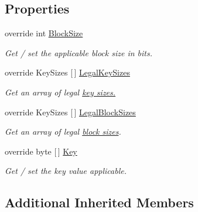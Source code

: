 \subsection*{Properties}
\begin{DoxyCompactItemize}
\item 
override int \hyperlink{class_i_c_sharp_code_1_1_sharp_zip_lib_1_1_encryption_1_1_pkzip_classic_managed_a66da85bc3587627858ae157947168745}{Block\+Size}
\begin{DoxyCompactList}\small\item\em Get / set the applicable block size in bits. \end{DoxyCompactList}\item 
override Key\+Sizes \mbox{[}$\,$\mbox{]} \hyperlink{class_i_c_sharp_code_1_1_sharp_zip_lib_1_1_encryption_1_1_pkzip_classic_managed_a14733d24deb8b0124d4f4620dfffb33e}{Legal\+Key\+Sizes}
\begin{DoxyCompactList}\small\item\em Get an array of legal \hyperlink{}{key sizes.} \end{DoxyCompactList}\item 
override Key\+Sizes \mbox{[}$\,$\mbox{]} \hyperlink{class_i_c_sharp_code_1_1_sharp_zip_lib_1_1_encryption_1_1_pkzip_classic_managed_ad7671cedabb0912b285c15385fe9cf8d}{Legal\+Block\+Sizes}
\begin{DoxyCompactList}\small\item\em Get an array of legal \hyperlink{}{block sizes}. \end{DoxyCompactList}\item 
override byte \mbox{[}$\,$\mbox{]} \hyperlink{class_i_c_sharp_code_1_1_sharp_zip_lib_1_1_encryption_1_1_pkzip_classic_managed_a5198a7212968d48a8edb4bd8a273593b}{Key}
\begin{DoxyCompactList}\small\item\em Get / set the key value applicable. \end{DoxyCompactList}\end{DoxyCompactItemize}
\subsection*{Additional Inherited Members}


